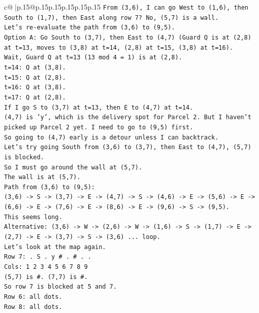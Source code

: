 \documentclass{article}
\begin{document}
{\begin{supertabular}{c@{$\;$}|p{.15\linewidth}@{}p{.15\linewidth}p{.15\linewidth}p{.15\linewidth}p{.15\linewidth}p{.15\linewidth}}
{{{\texttt{From (3,6), I can go West to (1,6), then South to (1,7), then East along row 7? No, (5,7) is a wall.} \\
\texttt{Let's re{-}evaluate the path from (3,6) to (9,5).} \\
\texttt{Option A: Go South to (3,7), then East to (4,7) (Guard Q is at (2,8) at t=13, moves to (3,8) at t=14, (2,8) at t=15, (3,8) at t=16).} \\
\texttt{Wait, Guard Q at t=13 (13 mod 4 = 1) is at (2,8).} \\
\texttt{t=14: Q at (3,8).} \\
\texttt{t=15: Q at (2,8).} \\
\texttt{t=16: Q at (3,8).} \\
\texttt{t=17: Q at (2,8).} \\
\texttt{If I go S to (3,7) at t=13, then E to (4,7) at t=14.} \\
\texttt{(4,7) is 'y', which is the delivery spot for Parcel 2. But I haven't picked up Parcel 2 yet. I need to go to (9,5) first.} \\
\texttt{So going to (4,7) early is a detour unless I can backtrack.} \\
\texttt{Let's try going South from (3,6) to (3,7), then East to (4,7), (5,7) is blocked.} \\
\texttt{So I must go around the wall at (5,7).} \\
\texttt{The wall is at (5,7).} \\
\texttt{Path from (3,6) to (9,5):} \\
\texttt{(3,6) {-}> S {-}> (3,7) {-}> E {-}> (4,7) {-}> S {-}> (4,6) {-}> E {-}> (5,6) {-}> E {-}> (6,6) {-}> E {-}> (7,6) {-}> E {-}> (8,6) {-}> E {-}> (9,6) {-}> S {-}> (9,5).} \\
\texttt{This seems long.} \\
\texttt{Alternative: (3,6) {-}> W {-}> (2,6) {-}> W {-}> (1,6) {-}> S {-}> (1,7) {-}> E {-}> (2,7) {-}> E {-}> (3,7) {-}> S {-}> (3,6) ... loop.} \\
\texttt{Let's look at the map again.} \\
\texttt{Row 7: . S . y \# . \# . .} \\
\texttt{Cols: 1 2 3 4 5 6 7 8 9} \\
\texttt{(5,7) is \#. (7,7) is \#.} \\
\texttt{So row 7 is blocked at 5 and 7.} \\
\texttt{Row 6: all dots.} \\
\texttt{Row 8: all dots.} \\
}}}
\end{supertabular}}
\end{document}
